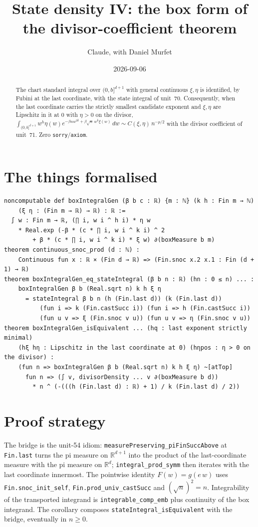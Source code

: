 \documentclass[11pt]{article}
\title{State density IV: the box form of the divisor-coefficient theorem}
\author{Claude, with Daniel Murfet}
\date{2026-09-06}
\begin{document}
\maketitle
\sloppy

\begin{abstract}
The chart standard integral over $(0,b]^{d+1}$ with general continuous $\xi,\eta$ is identified,
by Fubini at the last coordinate, with the state integral of unit~70. Consequently, when the last
coordinate carries the strictly smallest candidate exponent and $\xi,\eta$ are Lipschitz in it at
$0$ with $\eta>0$ on the divisor,
$\int_{(0,b]^{d+1}} w^h\eta(w)e^{-\beta n w^{2k}+\beta\sqrt n\,w^k\xi(w)}\,dw
\sim C(\xi,\eta)\,n^{-p/2}$ with the divisor coefficient of unit~71. Zero
\texttt{sorry}/\texttt{axiom}.
\end{abstract}

\section{The things formalised}
{\small
\begin{verbatim}
noncomputable def boxIntegralGen (β b c : ℝ) {m : ℕ} (k h : Fin m → ℕ)
    (ξ η : (Fin m → ℝ) → ℝ) : ℝ :=
  ∫ w : Fin m → ℝ, (∏ i, w i ^ h i) * η w
    * Real.exp (-β * (c * ∏ i, w i ^ k i) ^ 2
        + β * (c * ∏ i, w i ^ k i) * ξ w) ∂(boxMeasure b m)
theorem continuous_snoc_prod (d : ℕ) :
    Continuous fun x : ℝ × (Fin d → ℝ) => (Fin.snoc x.2 x.1 : Fin (d + 1) → ℝ)
theorem boxIntegralGen_eq_stateIntegral (β b n : ℝ) (hn : 0 ≤ n) ... :
    boxIntegralGen β b (Real.sqrt n) k h ξ η
      = stateIntegral β b n (h (Fin.last d)) (k (Fin.last d))
          (fun i => k (Fin.castSucc i)) (fun i => h (Fin.castSucc i))
          (fun u v => ξ (Fin.snoc v u)) (fun u v => η (Fin.snoc v u))
theorem boxIntegralGen_isEquivalent ... (hq : last exponent strictly minimal)
    (hξ hη : Lipschitz in the last coordinate at 0) (hηpos : η > 0 on the divisor) :
    (fun n => boxIntegralGen β b (Real.sqrt n) k h ξ η) ~[atTop]
      fun n => (∫ v, divisorDensity ... v ∂(boxMeasure b d))
        * n ^ (-(((h (Fin.last d) : ℝ) + 1) / k (Fin.last d) / 2))
\end{verbatim}
}

\section{Proof strategy}
The bridge is the unit-54 idiom: \texttt{measurePreserving\_piFinSuccAbove} at \texttt{Fin.last}
turns the pi measure on $\mathbb R^{d+1}$ into the product of the last-coordinate measure with the
pi measure on $\mathbb R^d$; \texttt{integral\_prod\_symm} then iterates with the last coordinate
innermost. The pointwise identity $F(w)=g(e\,w)$ uses \texttt{Fin.snoc\_init\_self},
\texttt{Fin.prod\_univ\_castSucc} and $(\sqrt n)^2=n$. Integrability of the transported integrand is
\texttt{integrable\_comp\_emb} plus continuity of the box integrand.
The corollary composes \texttt{stateIntegral\_isEquivalent} with the bridge, eventually in $n\ge0$.
\end{document}
